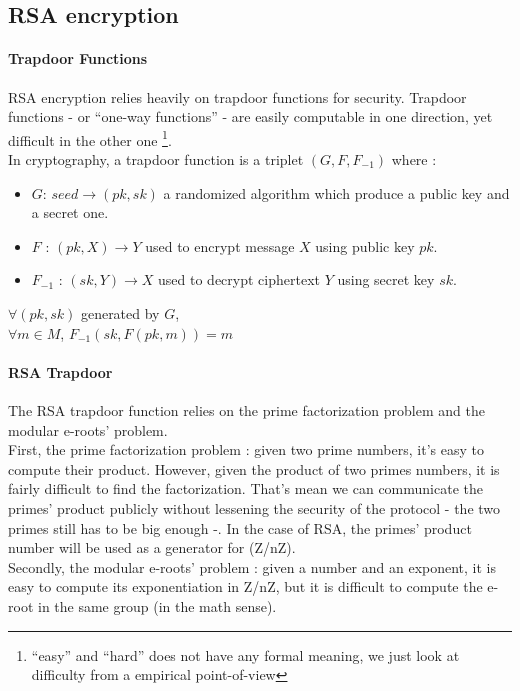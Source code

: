 \subsection{RSA encryption}


\paragraph{Trapdoor Functions}

RSA encryption relies heavily on trapdoor functions for security. Trapdoor functions - or ``one-way functions'' - are easily computable in one direction, yet difficult in the other one \footnote{``easy'' and ``hard'' does not have any formal meaning, we just look at difficulty from a empirical point-of-view}. \\

In cryptography, a trapdoor function is a triplet $(G, F, F_{-1})$ where :
\begin{itemize}
	\item $G$: $ seed \rightarrow (pk, sk) $ a randomized algorithm which produce a public key and a secret one.
	\item $F$ : $ (pk, X) \rightarrow  Y $ used to encrypt message $X$ using public key $pk$.
	\item $F_{-1}$ : $ (sk, Y) \rightarrow X $ used to decrypt ciphertext $Y$ using secret key $sk$.
\end{itemize}

\begin{mytheorem}
	$\forall (pk,sk) $ generated by $G$, \\
	$\forall m \in M $, $F_{-1}( sk, F(pk, m) ) = m $
\end{mytheorem}

\paragraph{RSA Trapdoor}

The RSA trapdoor function relies on the prime factorization problem and the modular e-roots' problem. \\
First, the prime factorization problem : given two prime numbers, it's easy to compute their product. However, given the product of two primes numbers, it is fairly difficult to find the factorization. That's mean we can communicate the primes' product publicly without lessening the security of the protocol - the two primes still has to be big enough -. In the case of RSA, the primes' product number will be used as a generator for (Z/nZ).\\
Secondly, the modular e-roots' problem : given a number and an exponent, it is easy to compute its exponentiation in Z/nZ, but it is difficult to compute the e-root in the same group (in the math sense).

